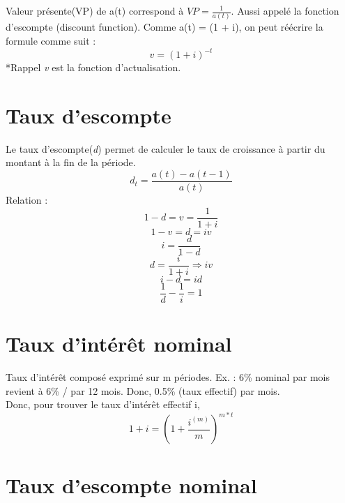 \documentclass[11pt,french]{report}
\begin{document}
Valeur présente(VP) de a(t) correspond à $VP = \frac{1}{a(t)}.$ Aussi appelé la fonction d'escompte (discount function). Comme a(t) = (1 + i), on peut réécrire la formule comme suit :
\begin{equation}
v = (1 + i)^{-t}
\end{equation}
*Rappel \textit{v} est la fonction d'actualisation.

\section{Taux d'escompte}
\label{sec:taux escompte}

Le taux d'escompte(\emph{d}) permet de calculer le taux de croissance à partir du montant à la fin de la période.
\begin{equation}
d_t = \frac{a(t) - a(t - 1)}{a(t)}
\end{equation}
Relation :
\begin{equation}
1 - d = v = \frac{1}{1 + i}
\end{equation}
\begin{equation}
1 - v = d = iv
\end{equation}
\begin{equation}
i = \frac{d}{1 - d}
\end{equation}
\begin{equation}
d = \frac{i}{1 + i} \Rightarrow iv
\end{equation}
\begin{equation}
i - d = id
\end{equation}
\begin{equation}
\frac{1}{d} - \frac{1}{i} = 1
\end{equation}

\section{Taux d'intérêt nominal}
\label{sec:intérêt nominal}

Taux d'intérêt composé exprimé sur m périodes. Ex. : 6\% nominal par mois revient à 6\% / par 12 mois. Donc, 0.5\% (taux effectif) par mois.
\\ Donc, pour trouver le taux d'intérêt effectif i, 
\begin{equation}
1 + i = (1 + \frac{i^{(m)}}{m})^{m*t}
\end{equation}

\section{Taux d'escompte nominal}
\label{sec:escompte nominal}
\end{document}
